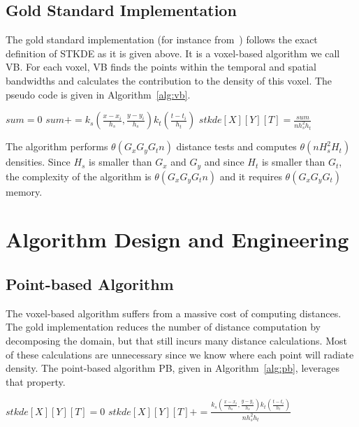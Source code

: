 \documentclass{article}
\begin{document}
\subsection{Gold Standard Implementation}

The gold standard implementation (for instance from~\cite{Hohl16}) follows the exact definition of STKDE
as it is given above. It is a voxel-based algorithm we call VB. For
each voxel, VB finds the points within the temporal and spatial bandwidths and calculates the contribution
to the density of this voxel. The pseudo code is given in Algorithm~\ref{alg:vb}.

\begin{algorithm}
\caption{\textsc{VB}}
\begin{algorithmic}
\State $sum = 0$
    \State $sum += k_s(\frac{x-x_i}{h_s},\frac{y-y_i}{h_s}) k_t(\frac{t-t_i}{h_t})$
    \EndIf
  \EndFor
  \State $stkde[X][Y][T] = \frac{sum}{n h_s^2h_t}$
\EndFor
\end{algorithmic}
\label{alg:vb}
\end{algorithm}


The algorithm performs $\theta(G_x G_y G_t n)$ distance tests and
computes $\theta(n H_s^2 H_t )$ densities. Since $H_s$ is smaller than
$G_x$ and $G_y$ and since $H_t$ is smaller than $G_t$, the complexity of the
algorithm is $\theta(G_x G_y G_t n )$ and it requires $\theta(G_x G_y G_t)$
memory.

\section{Algorithm Design and Engineering}

\label{sec:algo-seq}

\subsection{Point-based Algorithm}
The voxel-based algorithm suffers from a massive cost of computing
distances. The gold implementation reduces the number of distance computation by 
decomposing the domain, but that still incurs many distance calculations.
Most of these calculations are unnecessary since we know
where each point will radiate density. The point-based
algorithm PB, given in Algorithm~\ref{alg:pb}, leverages that
property.

\begin{algorithm}
\caption{\textsc{PB}}
\begin{algorithmic}
  \State $stkde[X][Y][T] = 0$
\EndFor
%
        \State $stkde[X][Y][T] += \frac{k_s(\frac{x-x_i}{h_s},\frac{y-y_i}{h_s}) k_t(\frac{t-t_i}{h_t})}{n h_s^2h_t}$
        \EndIf
      \EndFor
    \EndFor
  \EndFor
\EndFor
\end{algorithmic}
\label{alg:pb}
\end{algorithm}
\end{document}
